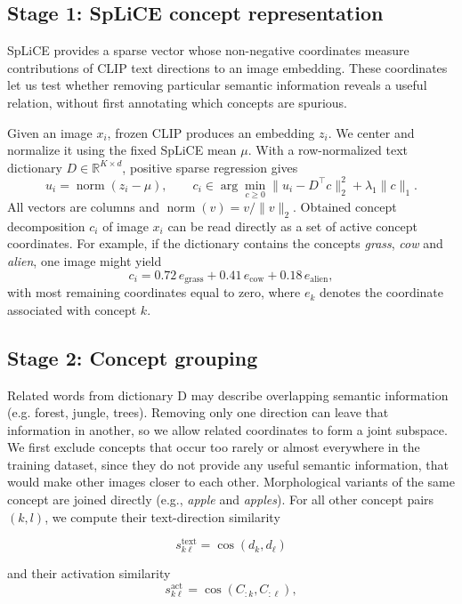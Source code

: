 \documentclass{article}
\begin{document}
\subsection{Stage 1: SpLiCE concept representation}
 SpLiCE provides a sparse vector whose non-negative coordinates measure contributions of CLIP text directions to an image embedding. These coordinates let us test whether removing particular semantic information reveals a useful relation, without first annotating which concepts are spurious.

Given an image $x_i$, frozen CLIP produces an embedding $z_i$. We center and normalize it using the fixed SpLiCE mean $\mu$. With a row-normalized text dictionary $D\in\mathbb{R}^{K\times d}$, positive sparse regression gives
\begin{equation}
 u_i=\operatorname{norm}(z_i-\mu),\qquad
 c_i\in\arg\min_{c\geq0}\|u_i-D^\top c\|_2^2+\lambda_1\|c\|_1.
\end{equation}
All vectors are columns and \(\operatorname{norm}(v)=v/\lVert v\rVert_2\). Obtained concept decomposition $c_i$ of image $x_i$ can be read directly as a set of active concept coordinates. For example, if the dictionary contains the concepts \emph{grass}, \emph{cow} and \emph{alien}, one image might yield
\[
c_i =
0.72\,e_{\text{grass}}
+ 0.41\,e_{\text{cow}}
+ 0.18\,e_{\text{alien}},
\]
with most remaining coordinates equal to zero, where $e_k$ denotes the
coordinate associated with concept $k$. 

\subsection{Stage 2: Concept grouping}
Related words from dictionary D may describe overlapping semantic information (e.g. forest, jungle, trees). Removing only one direction can leave that information in another, so we allow related coordinates to form a joint subspace. We first exclude concepts that occur too rarely or almost everywhere in the training dataset, since they do not provide any useful semantic information, that would make other images closer to each other. Morphological variants of the same concept are joined directly (e.g., \emph{apple} and \emph{apples}).  For all other concept pairs $(k,l)$, we compute their text-direction similarity

\begin{equation}
    s^{\mathrm{text}}_{k\ell} = \cos(d_k,d_\ell)
\end{equation}  

and their activation similarity
\begin{equation}
  s^{\mathrm{act}}_{k\ell} = \cos(C_{:k},C_{:\ell}),  
\end{equation}
\end{document}
